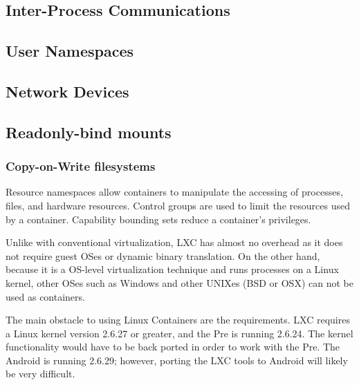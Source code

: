 \subsection{Inter-Process Communications}


\subsection{User Namespaces}


\subsection{Network Devices}


\subsection{Readonly-bind mounts}


\subsubsection{Copy-on-Write filesystems}


Resource namespaces allow containers to manipulate the accessing of processes, files, and hardware resources.  Control groups are used to limit the resources used by a container.  Capability bounding sets reduce a container's privileges.  

Unlike with conventional virtualization, LXC has almost no overhead as it does not require guest OSes or dynamic binary translation.  On the other hand, because it is a OS-level virtualization technique and runs processes on a Linux kernel, other OSes such as Windows and other UNIXes (BSD or OSX) can not be used as containers.  

The main obstacle to using Linux Containers are the requirements.  LXC requires a Linux kernel version 2.6.27 or greater, and the Pre is running 2.6.24.  The kernel functionality would have to be back ported in order to work with the Pre.  The Android is running 2.6.29; however, porting the LXC tools to Android will likely be very difficult.
